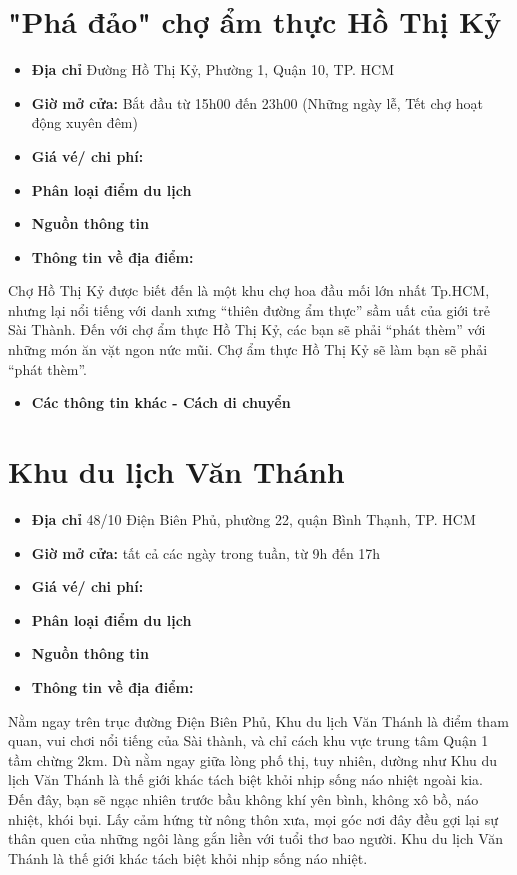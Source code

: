 \documentclass{article}
\begin{document}
\section{"Phá đảo" chợ ẩm thực Hồ Thị Kỷ}
\begin{itemize}
    \item{\textbf{Địa chỉ}} Đường Hồ Thị Kỷ, Phường 1, Quận 10, TP. HCM
    \item{\textbf{Giờ mở cửa:}} Bắt đầu từ 15h00 đến 23h00 (Những ngày lễ, Tết chợ hoạt động xuyên đêm)
    \item{\textbf{Giá vé/ chi phí:}}
    \item{\textbf{Phân loại điểm du lịch} }
    \item{\textbf{Nguồn thông tin}}
    \item{\textbf{Thông tin về địa điểm:}}
\end{itemize}
Chợ Hồ Thị Kỷ được biết đến là một khu chợ hoa đầu mối lớn nhất Tp.HCM, nhưng lại nổi tiếng với danh xưng “thiên đường ẩm thực” sầm uất của giới trẻ Sài Thành. Đến với chợ ẩm thực Hồ Thị Kỷ, các bạn sẽ phải “phát thèm” với những món ăn vặt ngon nức mũi. Chợ ẩm thực Hồ Thị Kỷ sẽ làm bạn sẽ phải “phát thèm”.
\begin{itemize}
    \item{\textbf{Các thông tin khác - Cách di chuyển}}
\end{itemize}

\section{Khu du lịch Văn Thánh}
\begin{itemize}
    \item{\textbf{Địa chỉ}} 48/10 Điện Biên Phủ, phường 22, quận Bình Thạnh, TP. HCM
    \item{\textbf{Giờ mở cửa:}} tất cả các ngày trong tuần, từ 9h đến 17h
    \item{\textbf{Giá vé/ chi phí:}}
    \item{\textbf{Phân loại điểm du lịch} }
    \item{\textbf{Nguồn thông tin}}
    \item{\textbf{Thông tin về địa điểm:}}
\end{itemize}

Nằm ngay trên trục đường Điện Biên Phủ, Khu du lịch Văn Thánh là điểm tham quan, vui chơi nổi tiếng của Sài thành, và chỉ cách khu vực trung tâm Quận 1 tầm chừng 2km. Dù nằm ngay giữa lòng phố thị, tuy nhiên, dường như Khu du lịch Văn Thánh là thế giới khác tách biệt khỏi nhịp sống náo nhiệt ngoài kia. Đến đây, bạn sẽ ngạc nhiên trước bầu không khí yên bình, không xô bồ, náo nhiệt, khói bụi. Lấy cảm hứng từ nông thôn xưa, mọi góc nơi đây đều gợi lại sự thân quen của những ngôi làng gắn liền với tuổi thơ bao người. Khu du lịch Văn Thánh là thế giới khác tách biệt khỏi nhịp sống náo nhiệt.
\end{document}
